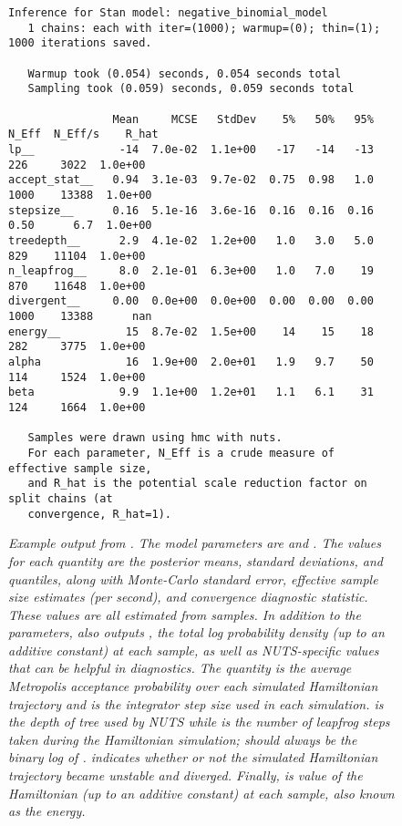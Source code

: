 \begin{figure}
\begin{Verbatim}[fontsize=\footnotesize]
   Inference for Stan model: negative_binomial_model
   1 chains: each with iter=(1000); warmup=(0); thin=(1); 1000 iterations saved.

   Warmup took (0.054) seconds, 0.054 seconds total
   Sampling took (0.059) seconds, 0.059 seconds total

                Mean     MCSE   StdDev    5%   50%   95%  N_Eff  N_Eff/s    R_hat
lp__             -14  7.0e-02  1.1e+00   -17   -14   -13    226     3022  1.0e+00
accept_stat__   0.94  3.1e-03  9.7e-02  0.75  0.98   1.0   1000    13388  1.0e+00
stepsize__      0.16  5.1e-16  3.6e-16  0.16  0.16  0.16   0.50      6.7  1.0e+00
treedepth__      2.9  4.1e-02  1.2e+00   1.0   3.0   5.0    829    11104  1.0e+00
n_leapfrog__     8.0  2.1e-01  6.3e+00   1.0   7.0    19    870    11648  1.0e+00
divergent__     0.00  0.0e+00  0.0e+00  0.00  0.00  0.00   1000    13388      nan
energy__          15  8.7e-02  1.5e+00    14    15    18    282     3775  1.0e+00
alpha             16  1.9e+00  2.0e+01   1.9   9.7    50    114     1524  1.0e+00
beta             9.9  1.1e+00  1.2e+01   1.1   6.1    31    124     1664  1.0e+00

   Samples were drawn using hmc with nuts.
   For each parameter, N_Eff is a crude measure of effective sample size,
   and R_hat is the potential scale reduction factor on split chains (at 
   convergence, R_hat=1).
\end{Verbatim}
\vspace*{-6pt}
\caption{\small\it Example output from .  The model
  parameters are  and .  The values for each
  quantity are the posterior means, standard deviations, and
  quantiles, along with Monte-Carlo standard error, effective sample
  size estimates (per second), and convergence diagnostic statistic.
  These values are all estimated from samples. In addition to the
  parameters,  also outputs , 
  the total log probability density (up to an additive constant) at each sample,
  as well as NUTS-specific values that can be helpful in diagnostics. 
  The quantity  is the average Metropolis acceptance 
  probability over each simulated Hamiltonian trajectory and  
  is the integrator step size used in each simulation.   is the 
  depth of tree used by NUTS while  is the number of leapfrog 
  steps taken during the Hamiltonian simulation;  should always
  be the binary log of .   indicates
  whether or not the simulated Hamiltonian trajectory became unstable and
  diverged.  Finally,  is value of the Hamiltonian (up to an additive
  constant) at each sample, also known as the energy.
  }
\label{bin-stansummary-eg.figure}
\end{figure}

